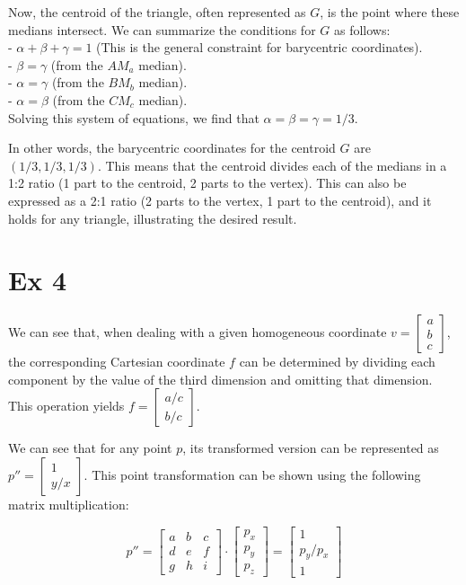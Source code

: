 \documentclass{article}
\begin{document}
Now, the centroid of the triangle, often represented as $G$, is the point where these medians intersect. We can summarize the conditions for $G$ as follows:
\\
- $\alpha + \beta + \gamma = 1$ (This is the general constraint for barycentric coordinates). \\
- $\beta = \gamma$ (from the $AM_a$ median). \\
- $\alpha = \gamma$ (from the $BM_b$ median). \\
- $\alpha = \beta$ (from the $CM_c$ median). \\

Solving this system of equations, we find that $\alpha = \beta = \gamma = 1/3$.

In other words, the barycentric coordinates for the centroid $G$ are $\left(1/3, 1/3, 1/3\right)$. This means that the centroid divides each of the medians in a 1:2 ratio (1 part to the centroid, 2 parts to the vertex). This can also be expressed as a 2:1 ratio (2 parts to the vertex, 1 part to the centroid), and it holds for any triangle, illustrating the desired result.





\cleardoublepage
\section*{Ex 4}
We can see that, when dealing with a given homogeneous coordinate $v = \begin{bmatrix} a \\ b \\ c \end{bmatrix}$, the corresponding Cartesian coordinate $f$ can be determined by dividing each component by the value of the third dimension and omitting that dimension. This operation yields $f = \begin{bmatrix} a/c \\ b/c \end{bmatrix}$.

We can see that for any point $p$, its transformed version can be represented as $p'' = \begin{bmatrix} 1 \\ y/x \end{bmatrix}$. This point transformation can be shown using the following matrix multiplication:

\[
    p'' = \begin{bmatrix} a & b & c \\ d & e & f \\ g & h & i \end{bmatrix} \cdot \begin{bmatrix} p_x \\ p_y \\ p_z \end{bmatrix} = \begin{bmatrix} 1 \\ p_y/p_x \\ 1 \end{bmatrix}
\]
\end{document}
